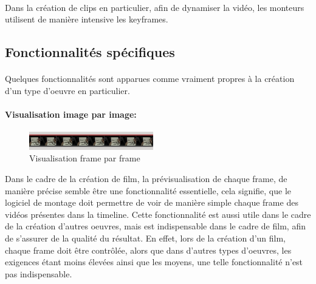 \paragraph{}

Dans la création de clips en particulier, afin de dynamiser la vidéo,
les monteurs utilisent de manière intensive les keyframes.

\subsection{Fonctionnalités spécifiques}

\paragraph{}

Quelques fonctionnalités sont apparues comme vraiment propres à la création
d'un type d'oeuvre en particulier.

\paragraph{Visualisation image par image:}

\begin{figure}
    \begin{center}
      \includegraphics[width=0.48\textwidth]{images/frameByFrame}
    \end{center} \caption{Visualisation frame par frame} \label{Yes}
\end{figure}

Dans le cadre de la création de film, la prévisualisation de chaque frame,
de manière précise semble être une fonctionnalité essentielle,
cela signifie, que le logiciel de montage doit permettre de
voir de manière simple chaque frame des vidéos présentes dans la
timeline. Cette fonctionnalité est aussi utile dans le cadre de
la création d'autres oeuvres, mais est indispensable dans le cadre
de film, afin de s'assurer de la qualité du résultat. En effet,
lors de la création d'un film, chaque frame doit être contrôlée,
alors que dans d'autres types d'oeuvres, les exigences étant moins
élevées ainsi que les moyens, une telle fonctionnalité n'est pas
indispensable.

